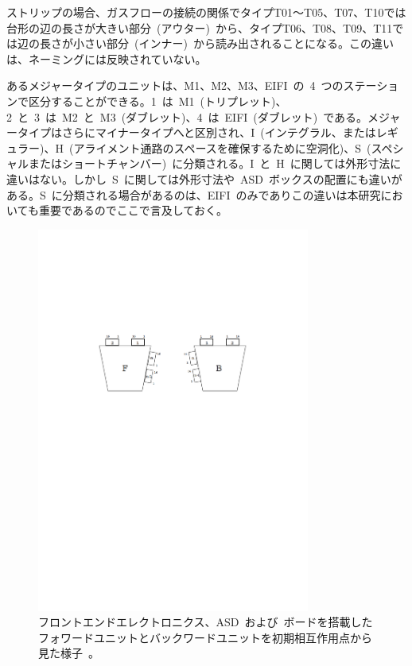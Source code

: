 ストリップの場合、ガスフローの接続の関係でタイプT01～T05、T07、T10では台形の辺の長さが大きい部分~(アウター)~から、タイプT06、T08、T09、T11では辺の長さが小さい部分~(インナー)~から読み出されることになる。この違いは、ネーミングには反映されていない。

あるメジャータイプのユニットは、M1、M2、M3、EIFI~の~4~つのステーションで区分することができる。1~は~M1~(トリプレット)、2~と~3~は~M2~と~M3~(ダブレット)、4~は~EIFI~(ダブレット)~である。メジャータイプはさらにマイナータイプへと区別され、I~(インテグラル、またはレギュラー)、H~(アライメント通路のスペースを確保するために空洞化)、S~(スペシャルまたはショートチャンバー)~に分類される。I~と~H~に関しては外形寸法に違いはない。しかし~S~に関しては外形寸法や~ASD~ボックスの配置にも違いがある。S~に分類される場合があるのは、EIFI~のみでありこの違いは本研究においても重要であるのでここで言及しておく。

\begin{figure}[h]
        \centering   
        \includegraphics[width=0.8\textwidth,page=1]{img/pdf/TGC.pdf}
        \caption[フロントエンドエレクトロニクス、ASD~および~ボードを搭載したフォワードユニットとバックワードユニット]{フロントエンドエレクトロニクス、ASD~および~ボードを搭載したフォワードユニットとバックワードユニットを初期相互作用点から見た様子~\cite{TR:02}。}
        \label{fig:tgcBF}
\end{figure}

